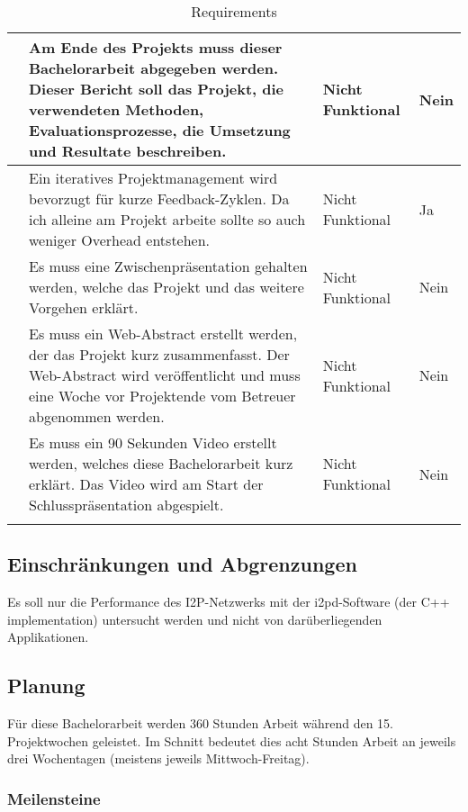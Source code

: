\begin{longtable}{N p{8.5cm} l l}
      & Am Ende des Projekts muss dieser Bachelorarbeit abgegeben werden. Dieser Bericht soll das Projekt, die verwendeten Methoden, Evaluationsprozesse, die Umsetzung und Resultate beschreiben.
                & Nicht Funktional & Nein \\ \midrule
      & Ein iteratives Projektmanagement wird bevorzugt für kurze Feedback-Zyklen. Da ich alleine am Projekt arbeite sollte so auch weniger Overhead entstehen. & Nicht Funktional & Ja \\ \midrule
      & Es muss eine Zwischenpräsentation gehalten werden, welche das Projekt und das weitere Vorgehen erklärt.
                & Nicht Funktional & Nein \\ \midrule
      & Es muss ein Web-Abstract erstellt werden, der das Projekt kurz zusammenfasst. Der Web-Abstract wird veröffentlicht und muss eine Woche vor Projektende vom Betreuer abgenommen werden.
                & Nicht Funktional & Nein \\ \midrule
      & Es muss ein 90 Sekunden Video erstellt werden, welches diese Bachelorarbeit kurz erklärt. Das Video wird am Start der Schlusspräsentation abgespielt.
                & Nicht Funktional & Nein \\ \midrule
    \bottomrule
    \caption{Requirements}\label{tab:requirements}
\end{longtable}


\newpage
\subsection{Einschränkungen und Abgrenzungen}

Es soll nur die Performance des I2P-Netzwerks mit der i2pd-Software (der C++ implementation) untersucht werden und nicht von darüberliegenden Applikationen.


\subsection{Planung}
\label{sec:Planung}

Für diese Bachelorarbeit werden 360 Stunden Arbeit während den 15. Projektwochen geleistet.
Im Schnitt bedeutet dies acht Stunden Arbeit an jeweils drei Wochentagen (meistens jeweils Mittwoch-Freitag).


\subsubsection{Meilensteine}
\label{sec:meilensteine}

